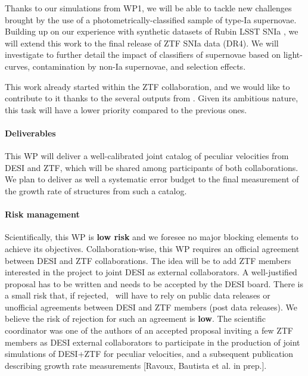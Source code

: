     Thanks to our simulations from WP1, we will be able to tackle new challenges 
    brought by the use of a photometrically-classified sample of type-Ia supernovae. 
    Building up on our experience with synthetic datasets of Rubin LSST SNIa
    \cite{rosselliForecastGrowthrateMeasurement2025,carreresTypeIaSupernova2025}, 
    we will extend this work to the final release of ZTF SNIa data (DR4).
    We will investigate to further detail the impact of classifiers of supernovae
    based on light-curves, contamination by non-Ia supernovae, and selection effects.
    
    This work already started within the ZTF collaboration, and we would like to 
    contribute to it thanks to the several outputs from \projacro. 
    Given its ambitious nature, this task will have a lower priority compared 
    to the previous ones. 


\paragraph{Deliverables}
  This WP will deliver a well-calibrated joint catalog of peculiar velocities from 
  DESI and ZTF, which will be shared among participants of both collaborations. 
  We plan to deliver as well a systematic error budget to the final measurement 
  of the growth rate of structures from such a catalog. 

\paragraph{Risk management} 
  Scientifically, this WP is \textbf{low risk} and we foresee no major blocking elements 
  to achieve its objectives.  
  Collaboration-wise, this WP requires an official agreement between DESI and ZTF 
  collaborations. The idea will be to add ZTF members interested in the project 
  to joint DESI as external collaborators. A well-justified proposal has to be 
  written and needs to be accepted by the DESI board. There is a small risk that, 
  if rejected, \projacro\ will have to rely on public data releases or unofficial 
  agreements between DESI and ZTF members (post data releases). 
  We believe the risk of rejection for such an agreement is \textbf{low}. 
  The scientific coordinator was one of the authors of 
  an accepted proposal inviting a few ZTF members as DESI external collaborators  
  to participate in the production of joint simulations of DESI+ZTF for peculiar velocities, 
  and a subsequent publication describing growth rate measurements 
  [Ravoux, Bautista et al. in prep.].


